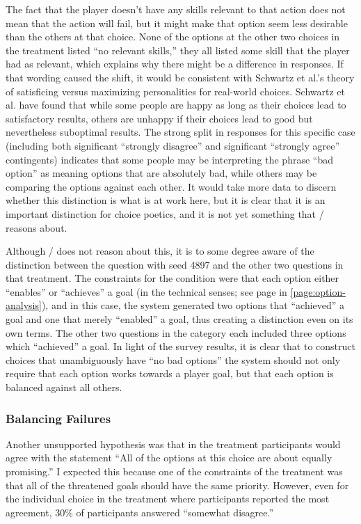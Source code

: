 The fact that the player doesn't have any skills relevant to that action does not mean that the action will fail, but it might make that option seem less desirable than the others at that choice.
%
None of the options at the other two choices in the \rlx{} treatment listed ``no relevant skills,'' they all listed some skill that the player had as relevant, which explains why there might be a difference in responses.
%
If that wording caused the shift, it would be consistent with Schwartz et al.'s theory of satisficing versus maximizing personalities \citep{Schwartz2002} for real-world choices.
%
Schwartz et al. have found that while some people are happy as long as their choices lead to satisfactory results, others are unhappy if their choices lead to good but nevertheless suboptimal results.
%
The strong split in responses for this specific case (including both significant ``strongly disagree'' and significant ``strongly agree'' contingents) indicates that some people may be interpreting the phrase ``bad option'' as meaning options that are absolutely bad, while others may be comparing the options against each other.
%
It would take more data to discern whether this distinction is what is at work here, but it is clear that it is an important distinction for choice poetics, and it is not yet something that \dunyazad/ reasons about.


Although \dunyazad/ does not reason about this, it is to some degree aware of the distinction between the question with seed 4897 and the other two questions in that treatment.
%
The constraints for the \rlx{} condition were that each option either ``enables'' or ``achieves'' a goal (in the technical senses; see page \pageref{page:option-analysis} in \cref{page:option-analysis}), and in this case, the system generated two options that ``achieved'' a goal and one that merely ``enabled'' a goal, thus creating a distinction even on its own terms.
%
The other two questions in the \rlx{} category each included three options which ``achieved'' a goal.
%
In light of the survey results, it is clear that to construct choices that unambiguously have ``no bad options'' the system should not only require that each option works towards a player goal, but that each option is balanced against all others.

\subsubsection{Balancing Failures}

Another unsupported hypothesis was that in the \dlm{} treatment participants would agree with the statement ``All of the options at this choice are about equally promising.''
%
I expected this because one of the constraints of the \dlm{} treatment was that all of the threatened goals should have the same priority.
%
However, even for the individual choice in the \dlm{} treatment where participants reported the most agreement, 30\% of participants answered ``somewhat disagree.'' 


